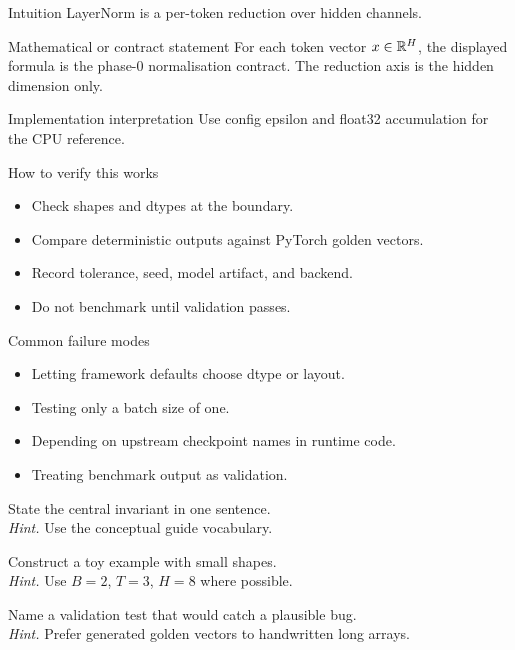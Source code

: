\begin{intuitionbox}{Intuition}
LayerNorm is a per-token reduction over hidden channels.
\end{intuitionbox}

\begin{definitionbox}{Mathematical or contract statement}
For each token vector \(x\in\mathbb{R}^H\), the displayed formula is the phase-0 normalisation contract. The reduction axis is the hidden dimension only.
\end{definitionbox}

\begin{implementationbox}{Implementation interpretation}
Use config epsilon and float32 accumulation for the CPU reference.
\end{implementationbox}

\begin{verificationbox}{How to verify this works}
\begin{itemize}
\item Check shapes and dtypes at the boundary.
\item Compare deterministic outputs against PyTorch golden vectors.
\item Record tolerance, seed, model artifact, and backend.
\item Do not benchmark until validation passes.
\end{itemize}
\end{verificationbox}

\begin{warningbox}{Common failure modes}
\begin{itemize}
\item Letting framework defaults choose dtype or layout.
\item Testing only a batch size of one.
\item Depending on upstream checkpoint names in runtime code.
\item Treating benchmark output as validation.
\end{itemize}
\end{warningbox}

\begin{chapterexercises}
\item State the central invariant in one sentence.\\
\textit{Hint.} Use the conceptual guide vocabulary.
\item Construct a toy example with small shapes.\\
\textit{Hint.} Use $B=2$, $T=3$, $H=8$ where possible.
\item Name a validation test that would catch a plausible bug.\\
\textit{Hint.} Prefer generated golden vectors to handwritten long arrays.
\end{chapterexercises}


